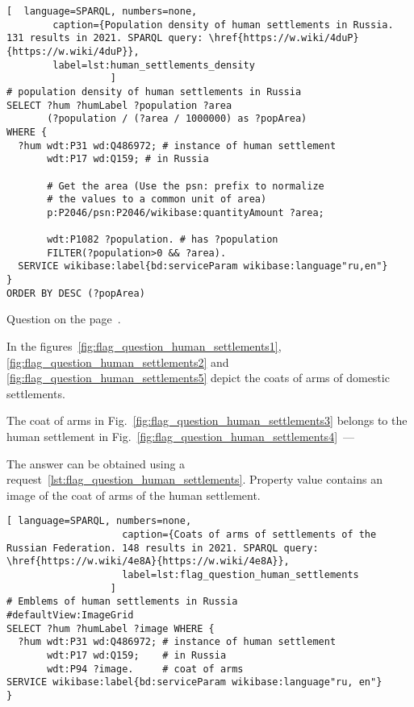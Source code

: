 \begin{lstlisting}[  language=SPARQL, numbers=none,
        caption={Population density of human settlements in Russia. 131 results in 2021. SPARQL query: \href{https://w.wiki/4duP}{https://w.wiki/4duP}},
        label=lst:human_settlements_density
                  ]
# population density of human settlements in Russia
SELECT ?hum ?humLabel ?population ?area 
       (?population / (?area / 1000000) as ?popArea) 
WHERE {
  ?hum wdt:P31 wd:Q486972; # instance of human settlement
       wdt:P17 wd:Q159; # in Russia
       
       # Get the area (Use the psn: prefix to normalize 
       # the values to a common unit of area)
       p:P2046/psn:P2046/wikibase:quantityAmount ?area;
       
       wdt:P1082 ?population. # has ?population
       FILTER(?population>0 && ?area).
  SERVICE wikibase:label{bd:serviceParam wikibase:language"ru,en"}
}
ORDER BY DESC (?popArea)
\end{lstlisting}

\small{Question on the page~\pageref{lst:human-settlement3}.}

\begin{exercise}
\label{answer:flag_human_settlements}
In the figures~\ref{fig:flag_question_human_settlements1}, 
\ref{fig:flag_question_human_settlements2} and 
\ref{fig:flag_question_human_settlements5} 
depict the coats of arms of domestic settlements.

The coat of arms in Fig.~\ref{fig:flag_question_human_settlements3}
belongs to the human settlement %
in Fig.~\ref{fig:flag_question_human_settlements4}~---

The answer can be obtained using a request~\ref{lst:flag_question_human_settlements}. 
    Property value  
    contains an image of the coat of arms of the human settlement.
\end{exercise}
   
\begin{lstlisting}[ language=SPARQL, numbers=none,
                    caption={Coats of arms of settlements of the Russian Federation. 148 results in 2021. SPARQL query: \href{https://w.wiki/4e8A}{https://w.wiki/4e8A}},
                    label=lst:flag_question_human_settlements
                  ]
# Emblems of human settlements in Russia
#defaultView:ImageGrid
SELECT ?hum ?humLabel ?image WHERE {
  ?hum wdt:P31 wd:Q486972; # instance of human settlement
       wdt:P17 wd:Q159;    # in Russia
       wdt:P94 ?image.     # coat of arms
SERVICE wikibase:label{bd:serviceParam wikibase:language"ru, en"}
}
\end{lstlisting}

